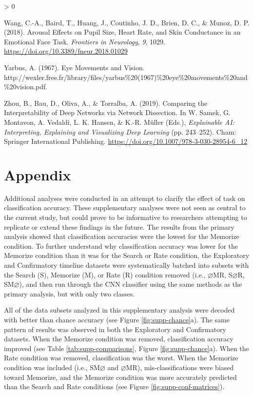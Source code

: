 \documentclass[
  english,
  man, donotrepeattitle,floatsintext]{apa6}
\newlength{\cslhangindent}
\newenvironment{CSLReferences}[2] %
 {%
  \setlength{\parindent}{0pt}
  \ifodd #1 \everypar{\setlength{\hangindent}{\cslhangindent}}\ignorespaces\fi
  \ifnum #2 > 0
  \setlength{\parskip}{#2\baselineskip}
  \fi
 }%
 {}
\begin{document}
\begin{CSLReferences}{1}{0}
\leavevmode\hypertarget{ref-wangArousalEffectsPupil2018}{}%
Wang, C.-A., Baird, T., Huang, J., Coutinho, J. D., Brien, D. C., \& Munoz, D. P. (2018). Arousal {Effects} on {Pupil Size}, {Heart Rate}, and {Skin Conductance} in an {Emotional Face Task}. \emph{Frontiers in Neurology}, \emph{9}, 1029. \url{https://doi.org/10.3389/fneur.2018.01029}

\leavevmode\hypertarget{ref-yarbusEyeMovementsVision1967a}{}%
Yarbus, A. (1967). Eye {Movements} and {Vision}. http://wexler.free.fr/library/files/yarbus\%20(1967)\%20eye\%20movements\%20and\%20vision.pdf.

\leavevmode\hypertarget{ref-zhouComparingInterpretabilityDeep2019a}{}%
Zhou, B., Bau, D., Oliva, A., \& Torralba, A. (2019). Comparing the {Interpretability} of {Deep Networks} via {Network Dissection}. In W. Samek, G. Montavon, A. Vedaldi, L. K. Hansen, \& K.-R. Müller (Eds.), \emph{Explainable {AI}: {Interpreting}, {Explaining} and {Visualizing Deep Learning}} (pp. 243--252). {Cham}: {Springer International Publishing}. \url{https://doi.org/10.1007/978-3-030-28954-6_12}

\end{CSLReferences}

\endgroup

\newpage

\section{Appendix}

Additional analyses were conducted in an attempt to clarify the effect of task on classification accuracy. These supplementary analyses were not seen as central to the current study, but could prove to be informative to researchers attempting to replicate or extend these findings in the future. The results from the primary analysis showed that classification accuracies were the lowest for the Memorize condition. To further understand why classification accuracy was lower for the Memorize condition than it was for the Search or Rate condition, the Exploratory and Confirmatory timeline datasets were systematically batched into subsets with the Search (S), Memorize (M), or Rate (R) condition removed (i.e., \(\varnothing\)MR, S\(\varnothing\)R, SM\(\varnothing\)), and then run through the CNN classifier using the same methods as the primary analysis, but with only two classes.

All of the data subsets analyzed in this supplementary analysis were decoded with better than chance accuracy (see Figure \ref{fig:supp-chance}a). The same pattern of results was observed in both the Exploratory and Confirmatory datasets. When the Memorize condition was removed, classification accuracy improved (see Table \ref{tab:supp-comparisons}, Figure \ref{fig:supp-chance}a). When the Rate condition was removed, classification was the worst. When the Memorize condition was included (i.e., SM\(\varnothing\) and \(\varnothing\)MR), mis-classifications were biased toward Memorize, and the Memorize condition was more accurately predicted than the Search and Rate conditions (see Figure \ref{fig:supp-conf-matrices}).
\end{document}
